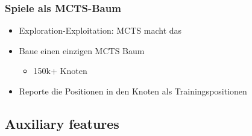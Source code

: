 \begin{frame}
 \frametitle{Spiele als MCTS-Baum}
  


\begin{itemize}
  \item \pause Exploration-Exploitation: MCTS macht das
  \item \pause Baue einen einzigen MCTS Baum
\begin{itemize}
  \item \pause 150k+ Knoten
\end{itemize}
  \item \pause Reporte die Positionen in den Knoten als Trainingspositionen
\end{itemize}

  
\end{frame}

\subsection{Auxiliary features}



